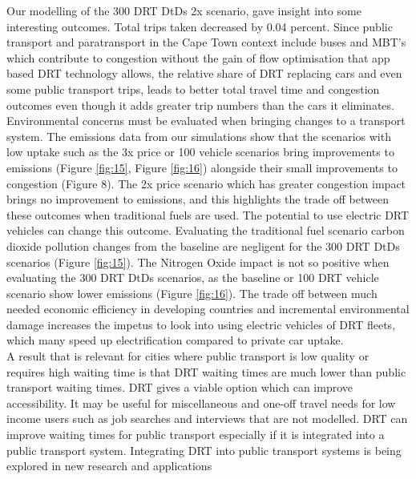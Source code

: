\documentclass[a4paper]{article}
\begin{document}
Our modelling of the 300 DRT DtDs 2x scenario, gave insight into some interesting outcomes.
Total trips taken decreased by 0.04 percent. Since public transport and paratransport in the Cape Town context include buses and MBT's which contribute to congestion without the gain of flow optimisation that app based DRT technology allows, the relative share of DRT replacing cars and even some public transport trips, leads to better total travel time and congestion outcomes even though it adds greater trip numbers than the cars it eliminates.\\

Environmental concerns must be evaluated when bringing changes to a transport system.
The emissions data from our simulations show that the scenarios with low uptake such as the 3x price or 100 vehicle scenarios bring improvements to emissions (Figure \ref{fig:15}, Figure \ref{fig:16}) alongside their small improvements to congestion (Figure 8). The 2x price scenario which has greater congestion impact brings no improvement to emissions, and this highlights the trade off between these outcomes when traditional fuels are used. The potential to use electric DRT vehicles can change this outcome. Evaluating the traditional fuel scenario carbon dioxide pollution changes from the baseline are negligent for the 300 DRT DtDs scenarios (Figure \ref{fig:15}). The Nitrogen Oxide impact is not so positive when evaluating the 300 DRT DtDs scenarios, as the baseline or 100 DRT vehicle scenario show lower emissions (Figure \ref{fig:16}). The trade off between much needed economic efficiency in developing countries and incremental environmental damage increases the impetus to look into using electric vehicles of DRT fleets, which many speed up electrification compared to private car uptake. \\

A result that is relevant for cities where public transport is low quality or requires high waiting time is that DRT waiting times are much lower than public transport waiting times. DRT gives a viable option which can improve accessibility. It may be useful for miscellaneous and one-off travel needs for low income users such as job searches and interviews that are not modelled. DRT can improve waiting times for public transport especially if it is integrated into a public transport system. Integrating DRT into public transport systems is being explored in new research and applications \citep{byala2021redesigning, Loubser, becker2020assessing}\\
\end{document}
